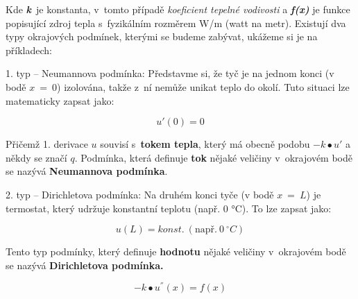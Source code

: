 Kde \emph{\textbf{k}}~je konstanta, v~tomto případě \emph{koeficient
tepelné vodivosti} a \emph{\textbf{f(x)}} je funkce popisující zdroj
tepla s~fyzikálním rozměrem W/m (watt na metr). Existují dva typy
okrajových podmínek, kterými se budeme zabývat, ukážeme si je na
příkladech:

1. typ -- Neumannova podmínka: Představme si, že tyč je na jednom konci
(v bodě \(x\  = \ 0\)) izolována, takže z~ní nemůže unikat teplo do
okolí. Tuto situaci lze matematicky zapsat jako:

\[u'\left( 0 \right) = 0\]

Přičemž 1. derivace \(u\) souvisí s~\textbf{tokem tepla}, který má
obecně podobu \(- k \bullet u'\) a někdy se značí \(q\). Podmínka, která
definuje \textbf{tok} nějaké veličiny v~okrajovém bodě se nazývá
\textbf{Neumannova podmínka}.

2. typ -- Dirichletova podmínka: Na druhém konci tyče (v bodě
\(x\  = \ L\)) je termostat, který udržuje konstantní teplotu (např. 0
°C). To lze zapsat jako:

\[u\left( L \right) = konst.\ (\text{např.}\ 0\ {^\circ}C)\]

Tento typ podmínky, který definuje \textbf{hodnotu} nějaké veličiny
v~okrajovém bodě se nazývá \textbf{Dirichletova podmínka.}

\[- k \bullet u^{''}\left( x \right) = f(x)\]


